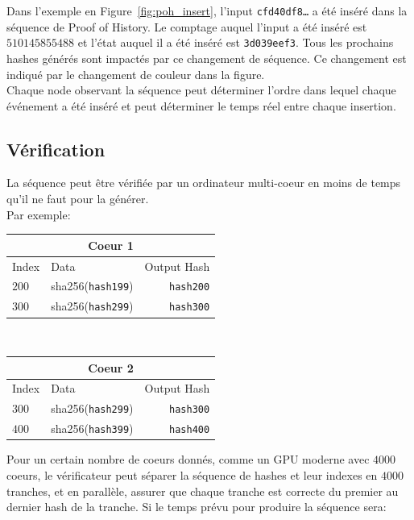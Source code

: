 \documentclass[12pt]{article}
\begin{document}
  Dans l’exemple en  Figure~\ref{fig:poh_insert}, l'input \texttt{cfd40df8\ldots} a été inséré dans la séquence de Proof of History. Le comptage auquel l’input a été inséré est $510145855488$ et l’état auquel il a été inséré est \texttt{3d039eef3}. Tous les prochains hashes générés sont impactés par ce changement de séquence. Ce changement est indiqué par le changement de couleur dans la figure.\\

Chaque node observant la séquence peut déterminer l’ordre dans lequel chaque événement a été inséré et peut déterminer le temps réel entre chaque insertion.

\subsection{Vérification}\label{poh:verify}
La séquence peut être vérifiée par un ordinateur multi-coeur en moins de temps qu’il ne faut pour la générer.\\

\noindent Par exemple: \\\noindent

\begin{center}

\begin{tabular}{l l r}
    \multicolumn{3}{c}{Coeur 1} \\ \hline
    Index & Data & Output Hash \\ \hline
    $200$ & sha256(\texttt{hash199}) & \texttt{hash200} \\
    $300$ & sha256(\texttt{hash299}) & \texttt{hash300}\\
    \end{tabular}\\

  \begin{tabular}{l l r}
    \multicolumn{3}{c}{Coeur 2} \\
    \hline
    Index & Data & Output Hash \\ \hline
    $300$ & sha256(\texttt{hash299}) & \texttt{hash300} \\
    $400$ & sha256(\texttt{hash399}) & \texttt{hash400}\\
    \end{tabular}

\end{center}


Pour un certain nombre de coeurs donnés, comme un GPU moderne avec $4000$ coeurs, le vérificateur peut séparer la séquence de hashes et leur indexes en $4000$ tranches, et en parallèle, assurer que chaque tranche est correcte du premier au dernier hash de la tranche. Si le temps prévu pour produire la séquence sera:\\
\end{document}

